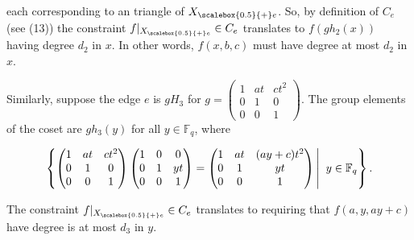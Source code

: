 \documentclass[10pt,a4paper]{article}
\begin{document}
each corresponding to an triangle of ${X}_{\scalebox{0.5}{+}e}$. So, by definition of $C_{e}$ (see (13)) the constraint $f|_{{X}_{\scalebox{0.5}{+}e}}\in C_{e}$ translates to $f(gh_{2}(x))$ having degree $d_{2}$ in $x$. In other words, $f(x,b,c)$ must have degree at most $d_{2}$ in $x$.\par




Similarly, suppose the edge $e$ is $gH_{3}$ for $g=\begin{pmatrix}1&at&ct^{2}\\
0&1&0\\
0&0&1\end{pmatrix}$. The group elements of the coset are $gh_{3}(y)$ for all $y\in\mathbb{F}_{q}$, where\par


\[\begin{gathered}
\displaystyle\left\{\begin{pmatrix}1&at&ct^{2}\\
0&1&0\\
0&0&1\end{pmatrix}\begin{pmatrix}1&0&0\\
0&1&yt\\
0&0&1\end{pmatrix}=\begin{pmatrix}1&at&(ay+c)t^{2}\\
0&1&yt\\
0&0&1\end{pmatrix}\left|\;\vphantom{\begin{pmatrix}1&at&ct^{2}\\
0&1&0\\
0&0&1\end{pmatrix}\begin{pmatrix}1&0&0\\
0&1&yt\\
0&0&1\end{pmatrix}=\begin{pmatrix}1&at&(ay+c)t^{2}\\
0&1&yt\\
0&0&1\end{pmatrix}y\in\mathbb{F}_{q}}\right.y\in\mathbb{F}_{q}\right\}.
\end{gathered}\]


The constraint $f|_{{X}_{\scalebox{0.5}{+}e}}\in C_{e}$ translates to requiring that $f(a,y,ay+c)$ have degree is at most $d_{3}$ in $y$.\par
\end{document}
